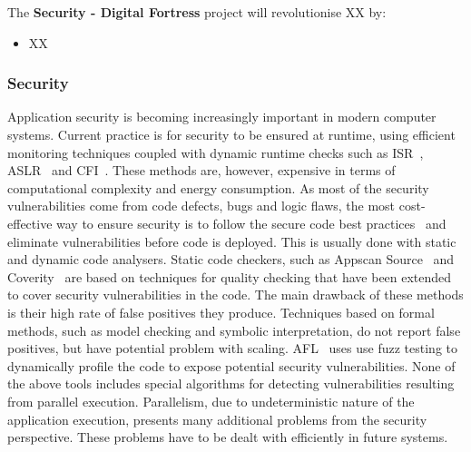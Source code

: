 \documentclass[a4paper,11pt]{article}
\newcommand{\project}[1]{\textbf{#1}\xspace}
\newcommand{\SECURITY}{\project{Security - Digital Fortress}}
\newcommand{\TheProject}{\SECURITY}
\begin{document}
The \TheProject{} project will revolutionise XX by:
\begin{itemize}
\item XX
\end{itemize}

\subsubsection{Security}
\label{sect:background-first}
\label{sect:security}

Application security is becoming increasingly important in modern computer systems.
Current practice is for security to be ensured at runtime, using efficient monitoring
techniques coupled with dynamic runtime checks such as ISR~\cite{isr}, ASLR~\cite{aslr}
and CFI~\cite{cfi}. These methods are, however, expensive in terms of computational
complexity and energy consumption. As most of the security vulnerabilities come from
code defects, bugs and logic flaws, the most cost-effective way to ensure security is
to follow the secure code best practices~\cite{OWASP} and eliminate vulnerabilities
before code is deployed. This is usually done with static and dynamic code analysers.
Static code checkers, such as Appscan Source~\cite{AppScan} and Coverity~\cite{Coverity}
are based on techniques for quality checking that
have been extended to cover security vulnerabilities in the code. The main drawback of 
these methods is their high rate of false positives they produce. Techniques based on
formal methods, such as model checking and symbolic interpretation, do not report false 
positives, but have potential problem with scaling. AFL~\cite{AFL} uses use fuzz testing 
to dynamically profile the code to expose potential security vulnerabilities. 
None of the above tools includes special algorithms for detecting vulnerabilities 
resulting from parallel execution. Parallelism, due to undeterministic nature of the
application execution, presents many additional problems from the security perspective. These problems have to be dealt with efficiently
in future systems.
\end{document}
